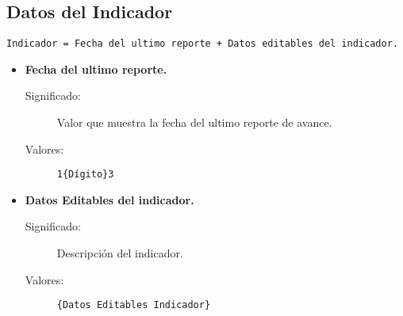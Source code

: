 \subsection{Datos del Indicador}
\label{dd:DatosIndicador}
\begin{lstlisting}
Indicador = Fecha del ultimo reporte + Datos editables del indicador.
\end{lstlisting}
  \begin{itemize}
    \item \textbf{Fecha del ultimo reporte.}
      \begin{description}
        \item [Significado:] Valor que muestra la fecha del ultimo reporte de avance.
        \item [Valores:]{\begin{lstlisting}
1{Dígito}3\end{lstlisting}}\end{description}

    \item \textbf{Datos Editables del indicador.}
      \begin{description}
        \item [Significado:] Descripción del indicador.
        \item [Valores:]{\begin{lstlisting}
{Datos Editables Indicador}\end{lstlisting}}\end{description}
\end{itemize}

